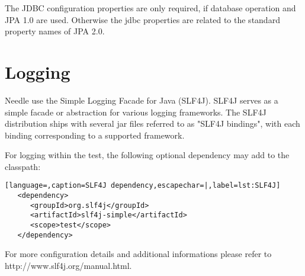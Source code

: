 The JDBC configuration properties are only required, if database operation and JPA 1.0 are used. Otherwise the jdbc properties are related to the standard property names of JPA 2.0.

\section{Logging}
Needle use the Simple Logging Facade for Java (SLF4J). SLF4J serves as a simple facade or abstraction for various logging frameworks.
The SLF4J distribution ships with several jar files referred to as "SLF4J bindings", with each binding corresponding to a supported framework. 


For logging within the test, the following optional dependency may add to the classpath:


\begin{lstlisting}[language=,caption=SLF4J dependency,escapechar=|,label=lst:SLF4J]
   <dependency>
      <groupId>org.slf4j</groupId>
      <artifactId>slf4j-simple</artifactId>
      <scope>test</scope>
   </dependency>
\end{lstlisting}

For more configuration details and additional informations please refer to http://www.slf4j.org/manual.html. 

  
 

